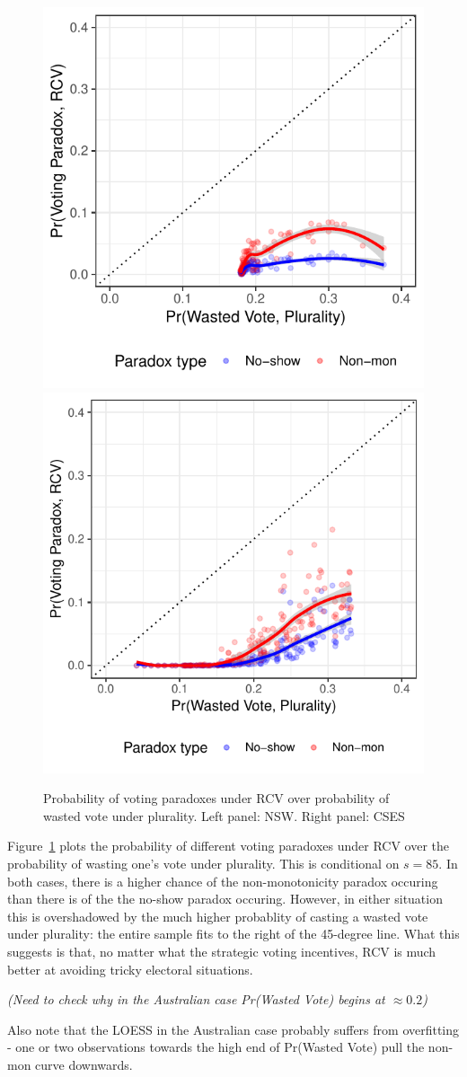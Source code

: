 \documentclass[11pt, letter, margin = 2 in]{article}
\begin{document}
\begin{figure}[!h]
	\centering
	\includegraphics[width = .45 \textwidth]{"../output/figures/paradoxes_aus"}
	\includegraphics[width = .45 \textwidth]{"../output/figures/paradoxes_cses"}
	\caption{Probability of voting paradoxes under RCV over probability of wasted vote under plurality. Left panel: NSW. Right panel: CSES}
	\label{fig:paradox}
\end{figure}

Figure~\ref{fig:paradox} plots the probability of different voting paradoxes under RCV over the probability of wasting one's vote under plurality. This is conditional on $s = 85$. In both cases, there is a higher chance of the non-monotonicity paradox occuring than there is of the the no-show paradox occuring. However, in either situation this is overshadowed by the much higher probablity of casting a wasted vote under plurality: the entire sample fits to the right of the 45-degree line. What this suggests is that, no matter what the strategic voting incentives, RCV is much better at avoiding tricky electoral situations.

\textit{(Need to check why in the Australian case Pr(Wasted Vote) begins at $\approx 0.2$)}

Also note that the LOESS in the Australian case probably suffers from overfitting - one or two observations towards the high end of Pr(Wasted Vote) pull the non-mon curve downwards.
\end{document}
